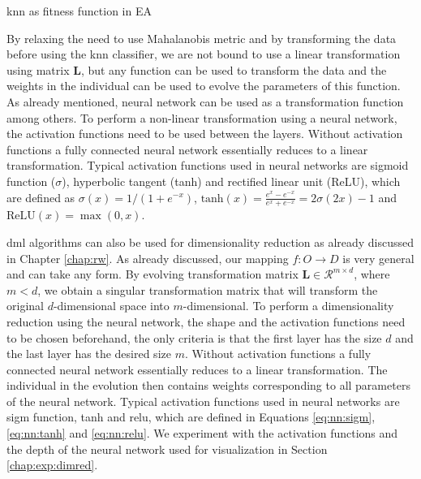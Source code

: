 \documentclass[12pt,a4paper]{report}
\begin{document}
\begin{algorithm}[t]
\caption{\ac{knn} as fitness function in EA} \label{pseudo:ea:knn}
\DontPrintSemicolon
\LinesNumbered
{}
\end{algorithm} 

By relaxing the need to use Mahalanobis metric and by transforming the data before using the \ac{knn} classifier, we are not bound to use a linear transformation using matrix $\bm{L}$, but any function can be used to transform the data and the weights in the individual can be used to evolve the parameters of this function. As already mentioned, neural network can be used as a transformation function among others. To perform a non-linear transformation using a neural network, the activation functions need to be used between the layers. Without activation functions a fully connected neural network essentially reduces to a linear transformation. Typical activation functions used in neural networks are sigmoid function ($\sigma$), hyperbolic tangent (tanh) and rectified linear unit (ReLU), which are defined as $\sigma(x) = 1/(1+e^{-x})$, $\text{tanh}(x) = \frac{e^x-e^{-x}}{e^x+e^{-x}} = 2\sigma(2x)-1$ and $\text{ReLU}(x) = \max(0,x)$.

\Acl{dml} algorithms can also be used for dimensionality reduction as already discussed in Chapter \ref{chap:rw}. As already discussed, our mapping $f: O \to D$ is very general and can take any form. By evolving transformation matrix $\bm{L} \in \mathcal{R}^{m\times d}$, where $m < d$, we obtain a singular transformation matrix that will transform the original $d$-dimensional space into $m$-dimensional. To perform a dimensionality reduction using the neural network, the shape and the activation functions need to be chosen beforehand, the only criteria is that the first layer has the size $d$ and the last layer has the desired size $m$. Without activation functions a fully connected neural network essentially reduces to a linear transformation. The individual in the evolution then contains weights corresponding to all parameters of the neural network. Typical activation functions used in neural networks are \acf{sigm} function, \acf{tanh} and \acf{relu}, which are defined in Equations \ref{eq:nn:sigm}, \ref{eq:nn:tanh} and \ref{eq:nn:relu}. We experiment with the activation functions and the depth of the neural network used for visualization in Section \ref{chap:exp:dimred}.
\end{document}
